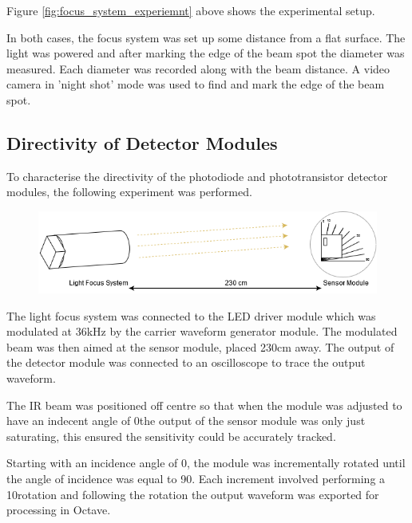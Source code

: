 Figure \ref{fig:focus_system_experiemnt} above shows the experimental setup.

In both cases, the focus system was set up some distance from a flat surface. The light was powered and after marking the edge of the beam spot the diameter was measured. Each diameter was recorded along with the beam distance. A video camera in 'night shot' mode was used to find and mark the edge of the beam spot.





\subsection{Directivity of Detector Modules}

To characterise the directivity of the photodiode and phototransistor detector modules, the following experiment was performed.

\begin{figure}[H]
	\centering
	\includegraphics[width=.9\linewidth]{figures/experimentation/beam_angle_of_receiver.png}
	\label{fig:directivity_experiement_setup}
\end{figure}

The light focus system was connected to the LED driver module which was modulated at 36kHz by the carrier waveform generator module. The modulated beam was then aimed at the sensor module, placed 230cm away. The output of the detector module was connected to an oscilloscope to trace the output waveform.

The IR beam was positioned off centre so that when the module was adjusted to have an indecent angle of 0\textdegree the output of the sensor module was only just saturating, this ensured the sensitivity could be accurately tracked.

Starting with an incidence angle of 0\textdegree, the module was incrementally rotated until the angle of incidence was equal to 90\textdegree. Each increment involved performing a 10\textdegree rotation and following the rotation the output waveform was exported for processing in Octave.

